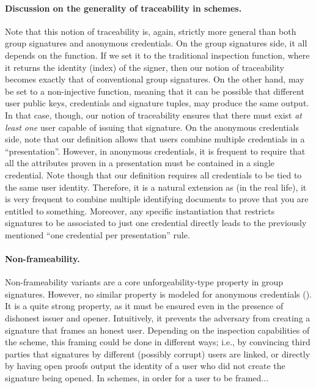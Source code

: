 \paragraph{Discussion on the generality of traceability in \UAS schemes.} %
Note that this notion of traceability is, again, strictly more general than
both group signatures and anonymous credentials. On the group signatures side,
it all depends on the \Inspect function. If we set it to the traditional
inspection function, where it returns the identity (index) of the signer, then
our notion of traceability becomes exactly that of conventional group
signatures. On the other hand, \Inspect may be set to a non-injective function,
meaning that it can be possible that different user public keys, credentials and
signature tuples, may produce the same output. In that case, though, our notion
of traceability ensures that there must exist \emph{at least one} user capable
of issuing that signature.
%
On the anonymous credentials side, note that our definition allows that users
combine multiple credentials in a ``presentation''. However, in anonymous
credentials, it is frequent to require that all the attributes proven in a
presentation must be contained in a single credential. Note though that our
definition requires all credentials to be tied to the same user identity.
Therefore, it is a natural extension as (in the real life), it is very frequent
to combine multiple identifying documents to prove that you are entitled to
something. Moreover, any specific instantiation that restricts signatures
to be associated to just one credential directly leads to the previously
mentioned ``one credential per presentation'' rule.


\paragraph{Non-frameability.} %
Non-frameability variants are a core unforgeability-type property in group
signatures. However, no
similar property is modeled for anonymous credentials (). It is a quite strong
property, as it must be ensured even in the presence of dishonest issuer and
opener. Intuitively, it prevents the adversary from creating a signature that
frames an honest user. Depending on the inspection capabilities of the scheme,
this framing could be done in different ways; i.e., by convincing third parties
that signatures by different (possibly corrupt) users are linked, or directly
by having open proofs output the identity of a user who did not create the
signature being opened.
%
In \UAS schemes, in order for a user to be framed...

